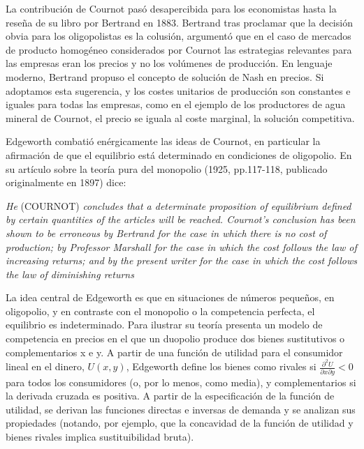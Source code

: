 \documentclass[10pt,a4paper]{article}
\newcommand{\authorfont}[1]{{\fontfamily{EBGaramond-TLF}\selectfont #1}}
\begin{document}
La contribución de Cournot pasó desapercibida para los economistas hasta la reseña de su libro por Bertrand en 1883. Bertrand tras proclamar que la decisión obvia para los oligopolistas es la colusión, argumentó que en el caso de mercados de producto homogéneo considerados por Cournot las estrategias relevantes para las empresas eran los precios y no los volúmenes de producción. En lenguaje moderno, Bertrand propuso el concepto de solución de Nash en precios. Si adoptamos esta sugerencia, y los costes unitarios de producción son constantes e iguales para todas las empresas, como en el ejemplo de los productores de agua mineral de Cournot, el precio se iguala al coste marginal, la solución competitiva. 

Edgeworth combatió enérgicamente las ideas de Cournot, en particular la afirmación de que el equilibrio está determinado en condiciones de oligopolio. En su artículo sobre la teoría pura del monopolio (1925, pp.117-118, publicado originalmente en 1897) dice: 

\begin{cita}[\authorfont{EDGEWORTH}][1925]
    \textit{He }(COURNOT)\textit{ concludes that a determinate proposition of equilibrium defined by certain quantities of the articles will be reached. Cournot's conclusion has been shown to be erroneous by Bertrand for the case in which there is no cost of production; by Professor Marshall for the case in which the cost follows the law of increasing returns; and by the present writer for the case in which the cost follows the law of diminishing returns}
\end{cita}

La idea central de Edgeworth es que en situaciones de números pequeños, en oligopolio, y en contraste con el monopolio o la competencia perfecta, el equilibrio es indeterminado. Para ilustrar su teoría presenta un modelo de competencia en precios en el que un duopolio produce dos bienes sustitutivos o complementarios x e y. A partir de una función de utilidad para el consumidor lineal en el dinero, $U(x, y)$, Edgeworth define los bienes como rivales si $\frac{\partial^2 U}{\partial x\partial y}<0$ para todos los consumidores (o, por lo menos, como media), y complementarios si la derivada cruzada es positiva. A partir de la especificación de la función de utilidad, se derivan las funciones directas e inversas de demanda y se analizan sus propiedades (notando, por ejemplo, que la concavidad de la función de utilidad y bienes rivales implica sustituibilidad bruta). 
\end{document}
